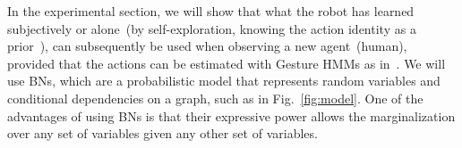 In the experimental section, we will show that what the robot has learned subjectively or alone~(by self-exploration, knowing the action identity as a prior~\cite{salvi:2012:smcb}), can subsequently be used when observing a new agent~(human), provided that the actions can be estimated with Gesture \acp{HMM} as in~\cite{saponaro:2013:crhri}. We will use \acfp{BN}, which are a probabilistic model that represents random variables and conditional dependencies on a graph, such as in Fig.~\ref{fig:model}. One of the advantages of using \acp{BN} is that their expressive power allows the marginalization over any set of variables given any other set of variables.
